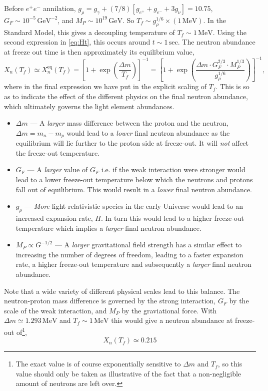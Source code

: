 \documentclass[11pt]{article}
\numberwithin{equation}{section}
\numberwithin{figure}{section}
\numberwithin{table}{section}
\begin{document}
Before $e^+ e^-$ annilation, $g_\rho = g_\gamma + (7/8)[g_{e^+} + g_{e^-} + 3 g_{\nu}] = 10.75$, $G_F \sim 10^{-5} \, \mathrm{GeV}^{-2}$, and $M_P \sim 10^{19} \, \mathrm{GeV}$. So $T_f \sim g_\rho^{1/6} \times (1 \, \mathrm{MeV})$. In the Standard Model, this gives a decoupling temperature of $T_f \sim 1\, \mathrm{MeV}$. Using the second expression in \eqref{eq:Ht}, this occurs around $t \sim 1 \, \mathrm{sec}$. The neutron abundance at freeze out time is then approximately its equilibrium value,
\begin{equation}
X_n(T_f) \simeq X_n^{\mathrm{eq}}(T_f) = \left[1 + \exp\left(\frac{\Delta m}{T_f}\right)\right]^{-1} = \left[1 + \exp \left(\frac{\Delta m \cdot G_F^{2/3} \cdot  M_P^{1/3}}{g_\rho^{1/6}}\right)\right]^{-1},
\end{equation}
where in the final expression we have put in the explicit scaling of $T_f$. This is so as to indicate the effect of the different physics on the final neutron abundance, which ultimately governs the light element abundances.
\begin{itemize}
\item $\Delta m$ --- A \textit{larger} mass difference between the proton and the neutron, $\Delta m = m_n - m_p$ would lead to a \textit{lower} final neutron abundance as the equilibrium will lie further to the proton side at freeze-out. It will \textit{not} affect the freeze-out temperature.
\item $G_F$ --- A \textit{larger} value of $G_F$ i.e. if the weak interaction were stronger would lead to a lower freeze-out temperature below which the neutrons and protons fall out of equilibrium. This would result in a \textit{lower} final neutron abundance.
\item $g_\rho$ --- \textit{More} light relativistic species in the early Universe would lead to an increased expansion rate, $H$. In turn this would lead to a higher freeze-out temperature which implies a \textit{larger} final neutron abundance.
\item $M_P \propto G^{-1/2}$ --- A \textit{larger} gravitational field strength has a similar effect to increasing the number of degrees of freedom, leading to a faster expansion rate, a higher freeze-out temperature and subsequently a \textit{larger} final neutron abundance.
\end{itemize}
Note that a wide variety of different physical scales lead to this balance. The neutron-proton mass difference is governed by the strong interaction, $G_F$ by the scale of the weak interaction, and $M_P$ by the graviational force. With $\Delta m \simeq 1.293 \, \mathrm{MeV}$ and $T_f \sim 1 \, \mathrm{MeV}$ this would give a neutron abundance at freeze-out of\footnote{The exact value is of course exponentially sensitive to $\Delta m$ and $T_f$, so this value should only be taken as illustrative of the fact that a non-negligible amount of neutrons are left over.},
\begin{equation}
X_n(T_f) \simeq 0.215
\end{equation}
\end{document}
